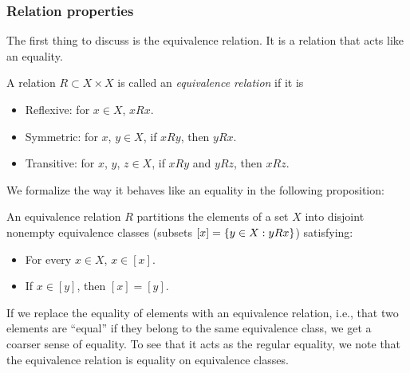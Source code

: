 \documentclass{article}
\begin{document}
\subsubsection{Relation properties}
The first thing to discuss is the equivalence relation. It is a relation that acts like an equality.
\begin{Definition}
  A relation $R \subset X \times X$ is called an \emph{equivalence relation} if it is
  \begin{itemize}
  \item Reflexive: for $x \in X$, $x R x$.
  \item Symmetric: for $x$, $y \in X$, if $x R y$, then $y R x$.
  \item Transitive: for $x$, $y$, $z \in X$, if $x R y$ and $y R z$, then $x R z$.
  \end{itemize}
\end{Definition}
We formalize the way it behaves like an equality in the following proposition:
\begin{Proposition}
An equivalence relation $R$ partitions the elements of a set $X$ into disjoint nonempty equivalence classes (subsets $[x] = \{y \in X : y R x\}$) satisfying: 
\begin{itemize}
\item For every $x \in X$, $x \in [x]$.
\item If $x \in [y]$, then $[x] = [y]$.
\end{itemize}
\end{Proposition}
If we replace the equality of elements with an equivalence relation, i.e., that two elements are ``equal'' if they belong to the same equivalence class, we get a coarser sense of equality. To see that it acts as the regular equality, we note that the equivalence relation is equality on equivalence classes.
\end{document}
